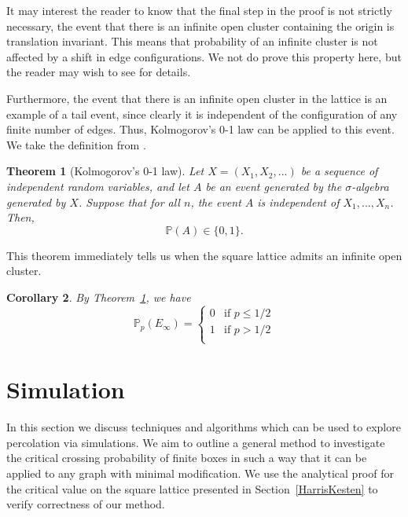 \documentclass[a4paper,11pt]{article}
\newtheorem{theorem}{Theorem}[section]
\newtheorem{corollary}[theorem]{Corollary}
\theoremstyle{definition}
\newcommand{\sigalg}{$\sigma$-algebra }
\newcommand{\prob}{\mathbb{P}_p}
\begin{document}
It may interest the reader to know that the final step in the proof is not strictly necessary, the event that there is an infinite open cluster containing the origin is translation invariant. This means that probability of an infinite cluster is not affected by a shift in edge configurations. We not do prove this property here, but the reader may wish to see \cite{duminil2018introduction} for details. 

Furthermore, the event that there is an infinite open cluster in the lattice is an example of a tail event, since clearly it is independent of the configuration of any finite number of edges. Thus, Kolmogorov's 0-1 law can be applied to this event. We take the definition from \cite{bollo2006}.
\begin{theorem}[Kolmogorov's 0-1 law]\label{01Law}
	Let $X = (X_1,X_2,...)$ be a sequence of independent random variables, and let $A$ be an event generated by the \sigalg generated by $X$. Suppose that for all $n$, the event $A$ is independent of $X_1,...,X_n$. Then, $$\mathbb{P}(A) \in \{0,1\}.$$
\end{theorem}
This theorem immediately tells us when the square lattice admits an infinite open cluster. 

\begin{corollary}
	By Theorem~\ref*{01Law}, we have 
	$$\prob(E_{\infty}) = \begin{cases}
		0 & \text{if }p \leq 1/2\\
		1 & \text{if }p > 1/2\\
	\end{cases} $$
\end{corollary}


\section{Simulation}
In this section we discuss techniques and algorithms which can be used to explore percolation via simulations. We aim to outline a general method to investigate the critical crossing probability of finite boxes in such a way that it can be applied to any graph with minimal modification. We use the analytical proof for the critical value on the square lattice presented in Section~\ref*{HarrisKesten} to verify correctness of our method.
\end{document}
